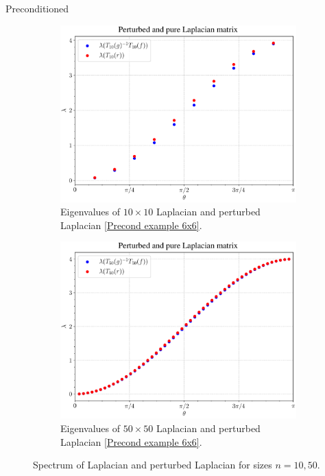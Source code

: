 \documentclass{beamer}
\begin{document}
\begin{frame}{Preconditioned}
    \begin{figure}[H]
    \centering
    \begin{subfigure}{0.49\textwidth}
        \includegraphics[width=\textwidth]{images/Precond_10.pdf}
        \caption{Eigenvalues of $10\times10$ Laplacian and perturbed Laplacian \eqref{Precond example 6x6}.}
        \label{fig:10x10 Laplacian & perturbed}
    \end{subfigure}
    \hfill
    \begin{subfigure}{0.49\textwidth}
        \includegraphics[width=\textwidth]{images/Precond_50.pdf}
        \caption{Eigenvalues of $50\times50$ Laplacian and perturbed Laplacian \eqref{Precond example 6x6}.}
        \label{fig:50x50 Laplacian & perturbed}
    \end{subfigure}
    \caption{Spectrum of Laplacian and perturbed Laplacian for sizes $n = 10,50$.}
    \label{fig:Spectrum Laplace & perturbed}
\end{figure}
\end{frame}
\end{document}
